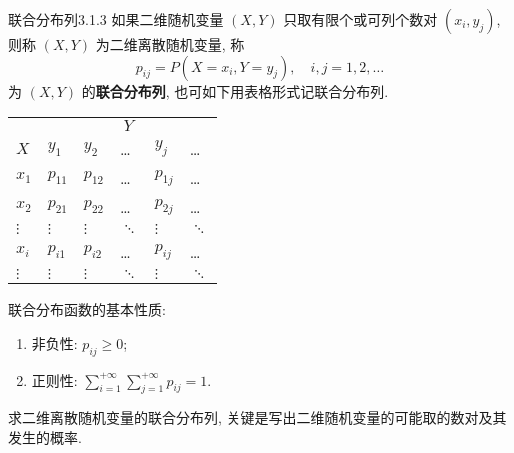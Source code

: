    \begin{definition}{联合分布列}{3.1.3}
		如果二维随机变量 $(X,Y)$ 只取有限个或可列个数对 $(x_i,y_j)$, 则称 $(X,Y)$ 为二维离散随机变量, 称
    \begin{equation}\label{eq:3.1.2}
     	p_{i j}=P\left(X=x_{i}, Y=y_{j}\right), \quad i, j=1,2, \ldots
    \end{equation}
   	为 $(X,Y)$ 的\textbf{联合分布列}, 也可如下用表格形式记联合分布列.
   \end{definition}
   \begin{center}
   		\begin{tabularx}{0.8\textwidth}{ZZZZZZ}
   		\toprule
   		 &  \\
   		 $X$	&	$y_1$&	$y_2$&	\ldots&	$y_j$& \ldots	\\
   		 \midrule
   		 $x_1$& $p_{11}$ & $p_{12}$ & \ldots & $p_{1j}$ & \ldots \\
   		 \midrule
   		 $x_2$& $p_{21}$ & $p_{22}$ & \ldots & $p_{2j}$ & \ldots \\
   		 \midrule
   		 $\vdots$& $\vdots$ & $\vdots$ & $\ddots$ & $\vdots$ & $\ddots$ \\
   		 \midrule
   		$x_i$ & $p_{i1}$ & $p_{i2}$ & \ldots & $p_{ij}$  & \ldots \\
   		\midrule
   		 $\vdots$& $\vdots$ & $\vdots$ & $\ddots$ & $\vdots$ & $\ddots$ \\
   		 \bottomrule
   		\end{tabularx}
   \end{center}
   联合分布函数的基本性质:
   \begin{enumerate}
   	\item 非负性: $p_{ij}\geq 0$;
   	\item 正则性: $\sum_{i=1}^{+\infty}\sum_{j=1}^{+\infty}p_{ij}=1$.
   \end{enumerate}
   求二维离散随机变量的联合分布列, 关键是写出二维随机变量的可能取的数对及其发生的概率.

